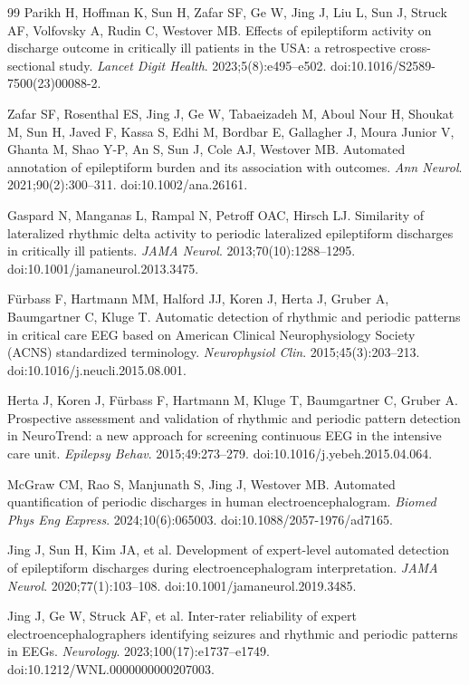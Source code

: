\documentclass{iopjournal}
\begin{document}
\begin{thebibliography}{99}
Parikh H, Hoffman K, Sun H, Zafar SF, Ge W, Jing J, Liu L, Sun J, Struck AF, Volfovsky A, Rudin C, Westover MB.
Effects of epileptiform activity on discharge outcome in critically ill patients in the USA: a retrospective cross-sectional study.
\textit{Lancet Digit Health}. 2023;5(8):e495--e502. doi:10.1016/S2589-7500(23)00088-2.

Zafar SF, Rosenthal ES, Jing J, Ge W, Tabaeizadeh M, Aboul Nour H, Shoukat M, Sun H, Javed F, Kassa S, Edhi M, Bordbar E, Gallagher J, Moura Junior V, Ghanta M, Shao Y-P, An S, Sun J, Cole AJ, Westover MB.
Automated annotation of epileptiform burden and its association with outcomes.
\textit{Ann Neurol}. 2021;90(2):300--311. doi:10.1002/ana.26161.

Gaspard N, Manganas L, Rampal N, Petroff OAC, Hirsch LJ.
Similarity of lateralized rhythmic delta activity to periodic lateralized epileptiform discharges in critically ill patients.
\textit{JAMA Neurol}. 2013;70(10):1288--1295. doi:10.1001/jamaneurol.2013.3475.

F\"urbass F, Hartmann MM, Halford JJ, Koren J, Herta J, Gruber A, Baumgartner C, Kluge T.
Automatic detection of rhythmic and periodic patterns in critical care EEG based on American Clinical Neurophysiology Society (ACNS) standardized terminology.
\textit{Neurophysiol Clin}. 2015;45(3):203--213. doi:10.1016/j.neucli.2015.08.001.

Herta J, Koren J, F\"urbass F, Hartmann M, Kluge T, Baumgartner C, Gruber A.
Prospective assessment and validation of rhythmic and periodic pattern detection in NeuroTrend: a new approach for screening continuous EEG in the intensive care unit.
\textit{Epilepsy Behav}. 2015;49:273--279. doi:10.1016/j.yebeh.2015.04.064.

McGraw CM, Rao S, Manjunath S, Jing J, Westover MB.
Automated quantification of periodic discharges in human electroencephalogram.
\textit{Biomed Phys Eng Express}. 2024;10(6):065003. doi:10.1088/2057-1976/ad7165.

Jing J, Sun H, Kim JA, et al.
Development of expert-level automated detection of epileptiform discharges during electroencephalogram interpretation.
\textit{JAMA Neurol}. 2020;77(1):103--108. doi:10.1001/jamaneurol.2019.3485.

Jing J, Ge W, Struck AF, et al.
Inter-rater reliability of expert electroencephalographers identifying seizures and rhythmic and periodic patterns in EEGs.
\textit{Neurology}. 2023;100(17):e1737--e1749. doi:10.1212/WNL.0000000000207003.


\end{thebibliography}
\end{document}
